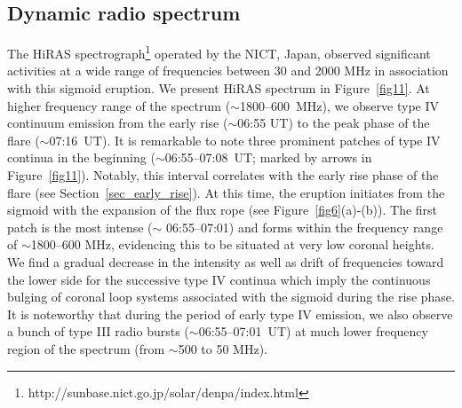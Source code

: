 \documentclass[twocolumn]{aastex6}
\begin{document}
\subsection{Dynamic radio spectrum}

The HiRAS spectrograph\footnote{http://sunbase.nict.go.jp/solar/denpa/index.html} operated by the NICT, Japan, observed significant activities at a wide range of frequencies between 30 and 2000 MHz in association with this sigmoid eruption. We present HiRAS spectrum in Figure~\ref{fig11}. At higher frequency range of the spectrum ($\sim$1800--600~MHz), we observe type IV continuum emission  from the early rise ($\sim$06:55 UT) to the peak phase of the flare ($\sim$07:16~UT). It is remarkable to note three prominent patches of type IV continua in the beginning ($\sim$06:55--07:08~UT; marked by arrows in Figure~\ref{fig11}). Notably, this interval correlates with the early rise phase of the flare (see Section~\ref{sec_early_rise}). At this time, the eruption initiates from the sigmoid with the expansion of the flux rope (see Figure~\ref{fig6}(a)-(b)). The first patch is the most intense ($\sim$ 06:55--07:01) and forms within the frequency range of $\sim$1800--600 MHz, evidencing this to be situated at very low coronal heights. We find a gradual decrease in the intensity as well as drift of frequencies toward the lower side for the successive type IV continua which imply the continuous bulging of coronal loop systems associated with the sigmoid during the rise phase. It is noteworthy that during the period of early type IV emission, we also observe a bunch of type III radio bursts ($\sim$06:55--07:01~UT) at much lower frequency region of the spectrum (from $\sim$500 to 50 MHz). 
\end{document}
